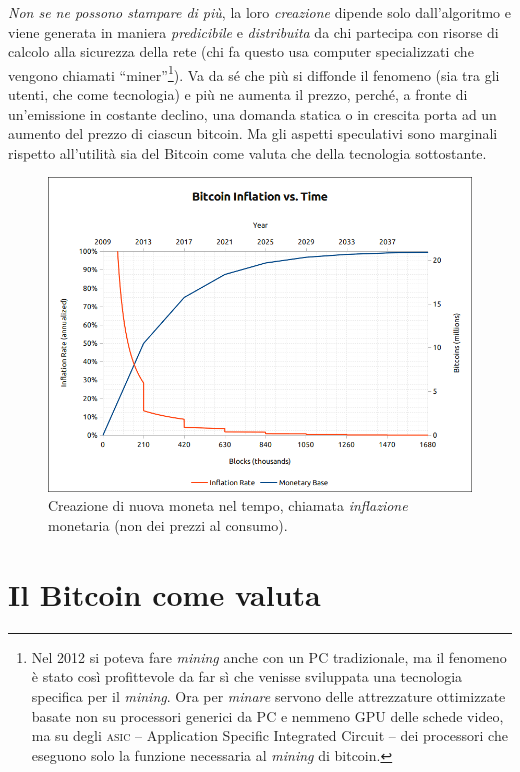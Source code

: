 \documentclass[a4paper,12pt,italian]{article}
\begin{document}
\emph{Non se ne possono stampare di più}, la loro \emph{creazione} dipende solo
dall’algoritmo e viene generata in maniera \emph{predicibile} e \emph{distribuita} da
chi partecipa con risorse di calcolo alla sicurezza della rete (chi fa
questo usa computer specializzati che vengono chiamati “miner”\footnote{Nel 2012 si poteva fare \emph{mining}
anche con un PC tradizionale, ma il fenomeno è stato così profittevole da far sì che venisse
sviluppata una tecnologia specifica per il \emph{mining}. Ora per \emph{minare} servono delle attrezzature 
ottimizzate basate non su processori generici da PC e nemmeno GPU delle schede video, ma su degli \textsc{asic} -- Application
Specific Integrated Circuit -- dei processori che eseguono solo la funzione necessaria al \emph{mining} di bitcoin.
}). Va da
sé che più si diffonde il fenomeno (sia tra gli utenti, che come
tecnologia) e più ne aumenta il prezzo, perché, a fronte di
un’emissione in costante declino, una domanda statica o in crescita
porta ad un aumento del prezzo di ciascun bitcoin. Ma gli aspetti
speculativi sono marginali rispetto all’utilità sia del Bitcoin come
valuta che della tecnologia sottostante.

\begin{figure}
\centering
\includegraphics[width=\linewidth]{figures/inflation.png}
\caption{Creazione di nuova moneta nel tempo, chiamata \emph{inflazione} monetaria (non dei prezzi al consumo).}
\end{figure}


\section*{Il Bitcoin come valuta}
\end{document}
